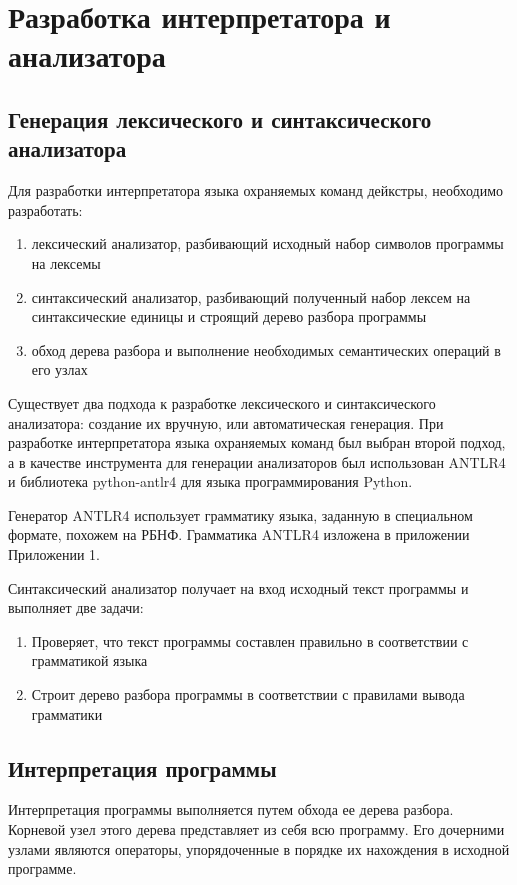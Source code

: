 \chapter{Разработка интерпретатора и анализатора} \label{ch3}

\section{Генерация лексического и синтаксического анализатора}
Для разработки интерпретатора языка охраняемых команд дейкстры, необходимо разработать:
\begin{enumerate}
    \item лексический анализатор, разбивающий исходный набор символов программы на лексемы
    \item синтаксический анализатор, разбивающий полученный набор лексем на синтаксические единицы и строящий
    дерево разбора программы
    \item обход дерева разбора и выполнение необходимых семантических операций в его узлах
\end{enumerate}

Существует два подхода к разработке лексического и синтаксического анализатора\cite{Compilers}: создание их вручную,
или автоматическая генерация. При разработке интерпретатора языка охраняемых команд был выбран второй подход,
а в качестве инструмента для генерации анализаторов был использован ANTLR4\cite{Antlr} и библиотека python-antlr4\cite{AntlrPython} для языка
программирования Python.

Генератор ANTLR4 использует грамматику языка, заданную в специальном формате, похожем на РБНФ.
Грамматика ANTLR4 изложена в приложении Приложении 1.

Синтаксический анализатор получает на вход исходный текст программы и выполняет две задачи:
\begin{enumerate}
    \item Проверяет, что текст программы составлен правильно в соответствии с грамматикой языка
    \item Строит дерево разбора программы в соответствии с правилами вывода грамматики
\end{enumerate}

\section{Интерпретация программы}
Интерпретация программы выполняется путем обхода ее дерева разбора. Корневой узел этого дерева
представляет из себя всю программу. Его дочерними узлами являются операторы, упорядоченные 
в порядке их нахождения в исходной программе.

